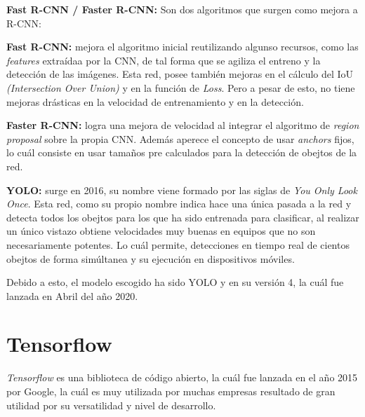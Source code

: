 \begin{list}{\textbullet}{ %
    \addtolength{\itemsep}{-2mm} %
    \setlength{\itemindent}{2mm}}

    \clearpage

    \item \textbf{Fast R-CNN / Faster R-CNN:} Son dos algoritmos que surgen como mejora a R-CNN\cite{faster_rcnn}:
    \begin{list}{\textbullet}{ %
        \addtolength{\itemsep}{-2mm} %
        \setlength{\itemindent}{2mm}}
        \item \textbf{Fast R-CNN:} mejora el algoritmo inicial reutilizando algunso recursos, como las \textit{features} extraídaa por la CNN, de tal forma que se agiliza el entreno y la detección de las imágenes.
        Esta red, posee también mejoras en el cálculo del IoU \textit{(Intersection Over Union)} y en la función de \textit{Loss}. Pero a pesar de esto, no tiene mejoras drásticas en la velocidad de entrenamiento y en la detección.
       \item \textbf{Faster R-CNN:} logra una mejora de velocidad al integrar el algoritmo de \textit{region proposal}\cite{region_proposal} sobre la propia CNN.
       Además aperece el concepto de usar \textit{anchors} fijos, lo cuál consiste en usar tamaños pre calculados para la detección de obejtos de la red.
    \end{list}
    
    \clearpage

    \item \textbf{YOLO:} surge en 2016, su nombre viene formado por las siglas de \textit{You Only Look Once}\cite{yolov4}.
    Esta red, como su propio nombre indica hace una única pasada a la red y detecta todos los obejtos para los que ha sido entrenada para clasificar, al realizar un único vistazo obtiene velocidades muy buenas en equipos que no son necesariamente potentes. Lo cuál permite, detecciones en tiempo real de cientos obejtos de forma simúltanea y su ejecución en dispositivos móviles.  
\end{list}
Debido a esto, el modelo escogido ha sido YOLO y en su versión 4, la cuál fue lanzada en Abril del año 2020.


\clearpage

\section{Tensorflow}
\textit{Tensorflow}\cite{tensorflow} es una biblioteca de código abierto, la cuál fue lanzada en el año 2015 por Google, la cuál es muy utilizada por muchas empresas resultado de gran utilidad por su versatilidad y nivel de desarrollo.

